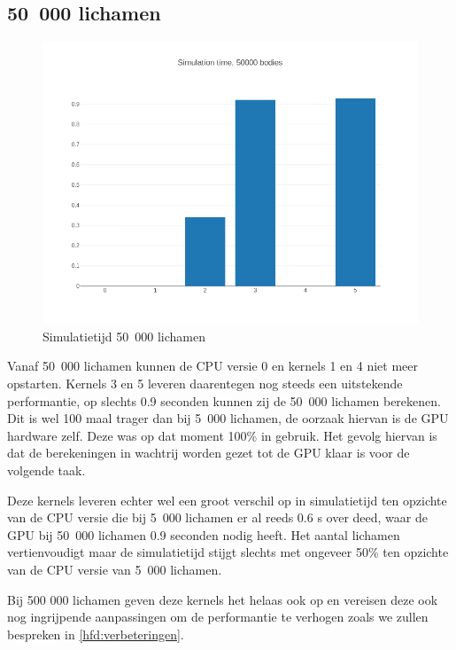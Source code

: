 \documentclass{article}
\begin{document}
\subsection{50~000 lichamen}
\begin{figure}[H]
    \includegraphics[width=\linewidth]{./grafiekskes/hist_simulation50000.png}
    \caption{Simulatietijd 50~000 lichamen}
\end{figure}

Vanaf 50~000 lichamen kunnen de CPU versie 0 en kernels 1 en 4 niet meer opstarten.
Kernels 3 en 5 leveren daarentegen nog steeds een uitstekende performantie, op
slechts 0.9 seconden kunnen zij de 50~000 lichamen berekenen. Dit is wel 100 maal
trager dan bij 5~000 lichamen, de oorzaak hiervan is de GPU hardware zelf. Deze was
op dat moment 100\% in gebruik. Het gevolg hiervan is dat de berekeningen in wachtrij
worden gezet tot de GPU klaar is voor de volgende taak.

Deze kernels leveren echter wel een groot verschil op in simulatietijd ten opzichte van de CPU versie
die bij 5~000 lichamen er al reeds 0.6 s over deed, waar de GPU bij 50~000 lichamen 0.9 seconden nodig heeft.
Het aantal lichamen vertienvoudigt maar de
simulatietijd stijgt slechts met ongeveer 50\% ten opzichte van de CPU versie van 5~000 lichamen.

Bij 500 000 lichamen geven deze kernels het helaas ook op en vereisen deze ook nog
ingrijpende aanpassingen om de performantie te verhogen zoals we zullen bespreken in \ref{hfd:verbeteringen}.
\end{document}
